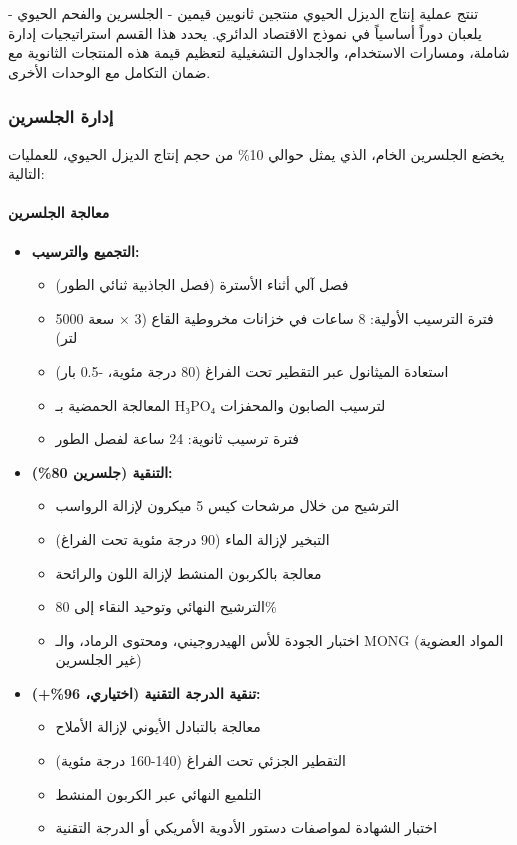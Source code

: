 تنتج عملية إنتاج الديزل الحيوي منتجين ثانويين قيمين - الجلسرين والفحم الحيوي - يلعبان دوراً أساسياً في نموذج الاقتصاد الدائري. يحدد هذا القسم استراتيجيات إدارة شاملة، ومسارات الاستخدام، والجداول التشغيلية لتعظيم قيمة هذه المنتجات الثانوية مع ضمان التكامل مع الوحدات الأخرى.

\subsubsection{إدارة الجلسرين}
\label{sec:glycerin_utilization}

يخضع الجلسرين الخام، الذي يمثل حوالي 10\% من حجم إنتاج الديزل الحيوي، للعمليات التالية:

\paragraph{معالجة الجلسرين}
\begin{itemize}
    \item \textbf{التجميع والترسيب:}
    \begin{itemize}
        \item فصل آلي أثناء الأسترة (فصل الجاذبية ثنائي الطور)
        \item فترة الترسيب الأولية: 8 ساعات في خزانات مخروطية القاع (3 × سعة 5000 لتر)
        \item استعادة الميثانول عبر التقطير تحت الفراغ (80 درجة مئوية، -0.5 بار)
        \item المعالجة الحمضية بـ H₃PO₄ لترسيب الصابون والمحفزات
        \item فترة ترسيب ثانوية: 24 ساعة لفصل الطور
    \end{itemize}
    
    \item \textbf{التنقية (جلسرين 80\%):}
    \begin{itemize}
        \item الترشيح من خلال مرشحات كيس 5 ميكرون لإزالة الرواسب
        \item التبخير لإزالة الماء (90 درجة مئوية تحت الفراغ)
        \item معالجة بالكربون المنشط لإزالة اللون والرائحة
        \item الترشيح النهائي وتوحيد النقاء إلى 80\%
        \item اختبار الجودة للأس الهيدروجيني، ومحتوى الرماد، والـ MONG (المواد العضوية غير الجلسرين)
    \end{itemize}
    
    \item \textbf{تنقية الدرجة التقنية (اختياري، 96\%+):}
    \begin{itemize}
        \item معالجة بالتبادل الأيوني لإزالة الأملاح
        \item التقطير الجزئي تحت الفراغ (140-160 درجة مئوية)
        \item التلميع النهائي عبر الكربون المنشط
        \item اختبار الشهادة لمواصفات دستور الأدوية الأمريكي أو الدرجة التقنية
    \end{itemize}
\end{itemize}

